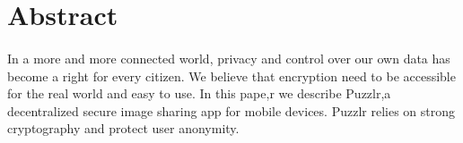 \section{Abstract}
  \paragraph{}
  In a more and more connected world, privacy and control over our own data has become a right for every citizen. We believe that encryption need to be accessible for the real world and easy to use. In this pape,r we describe Puzzlr,a decentralized secure image sharing app for mobile devices. Puzzlr relies on strong cryptography and protect user anonymity.